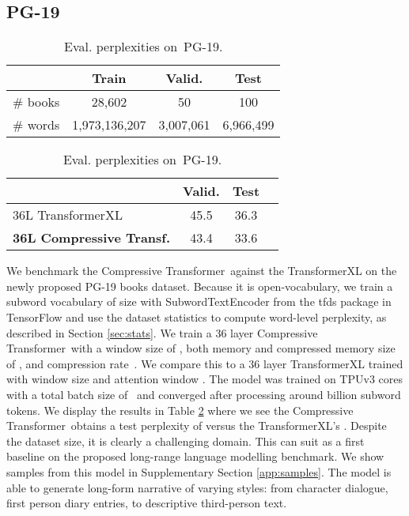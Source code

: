 \documentclass{article} \usepackage{iclr2020_conference,times}
\newcommand{\model}{Compressive Transformer}
\newcommand{\dataset}{PG-19}
\begin{document}
\subsection{PG-19}
\begin{table}
    \centering
    \footnotesize
    \begin{minipage}[t]{0.52\linewidth}
        \caption{\dataset~statistics split by subsets.}
        \begin{tabular}{l c c c}
            \toprule
            & \textbf{Train} & \textbf{Valid.} & \textbf{Test} \\
            \midrule
            \# books & 28,602 &	50	& 100  \\
            \# words & 1,973,136,207	& 3,007,061 &	6,966,499    \\
        \bottomrule
        \end{tabular}
        \label{tab:gutenberg_subsets}
    \end{minipage}
    \begin{minipage}[t]{0.45\linewidth}
        \footnotesize
        \caption{Eval. perplexities on~\dataset.}
        \begin{tabular}{lc c c}
        \toprule
        & Valid. & Test \\
        \midrule
        36L TransformerXL & 45.5 & 36.3 \\
        \textbf{36L Compressive Transf.} & 43.4 & 33.6 \\
        \bottomrule
        \end{tabular}
        \label{tab:gutenberg}
    \end{minipage}
\end{table}
We benchmark the \model~against the TransformerXL on the newly proposed PG-19 books dataset. Because it is open-vocabulary, we train a subword vocabulary of size  with SubwordTextEncoder from the tfds package in TensorFlow and use the dataset statistics to compute word-level perplexity, as described in Section \ref{sec:stats}.
We train a 36 layer \model~with a window size of , both memory and compressed memory size of , and compression rate~. We compare this to a 36 layer TransformerXL trained with window size  and attention window .
The model was trained on  TPUv3 cores with a total batch size of~ and converged after processing around  billion subword tokens. We display the results in Table \ref{tab:gutenberg} where we see the \model~obtains a test perplexity of  versus the TransformerXL's . Despite the dataset size, it is clearly a challenging domain. This can suit as a first baseline on the proposed long-range language modelling benchmark. We show samples from this model in Supplementary Section \ref{app:samples}. The model is able to generate long-form narrative of varying styles: from character dialogue, first person diary entries, to descriptive third-person text. 
\end{document}
